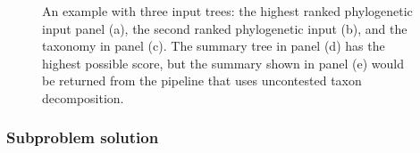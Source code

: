 \documentclass[fleqn,12pt,lineno,english]{wlpeerj}
\begin{document}
\begin{figure}
{}

\hfill{}\hfill{}\hfill{}

\caption{An example with three input trees: the highest ranked phylogenetic
input panel (a), the second ranked phylogenetic input (b), and the
taxonomy in panel (c). The summary tree in panel (d) has the highest
possible score, but the summary shown in panel (e) would be returned
from the pipeline that uses uncontested taxon decomposition.}
\label{fig:decompose-worsens}
\end{figure}


\subsubsection{Subproblem solution\label{subsec:Subproblem-solution}}
\end{document}

